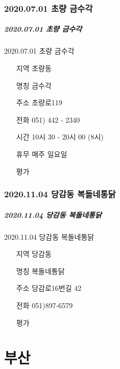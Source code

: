 \documentclass[aspectratio=1610,17pt,xcolor=pdftex,dvipsnames,table,handout]{beamer}
\begin{document}
		\section{ 2020.07.01 초량 금수각 }
		\begin{frame} [t,plain]
		\frametitle{ 2020.07.01 초량 금수각 }
			\begin{block} { 2020.07.01 초량 금수각 }
			\setlength{\leftmargini}{4em}			
			\begin{itemize}
				\item [지역] 초량동
				\item [명칭] 금수각
				\item [주소] 초량로119
				\item [전화] 051) 442 - 2340
				\item [시간] 10시 30 - 20시 00 (8시)
				\item [휴무] 매주 일요일
				\item [평가] 
			\end{itemize}
			\end{block}						
		\end{frame}						


		\section{ 2020.11.04 당감동 복돌네통닭}
		\begin{frame} [t,plain]
		\frametitle{ 2020.11.04 당감동 복돌네통닭}
			\begin{block} { 2020.11.04 당감동 복돌네통닭}
			\setlength{\leftmargini}{4em}			
			\begin{itemize}
				\item [지역] 당감동
				\item [명칭] 복돌네통닭
				\item [주소] 당감로16번길 42
				\item [전화] 051)897-6579
				\item [평가] 
			\end{itemize}
			\end{block}						
		\end{frame}						



		\part{ 부산 }
		\frame{\partpage}
\end{document}
